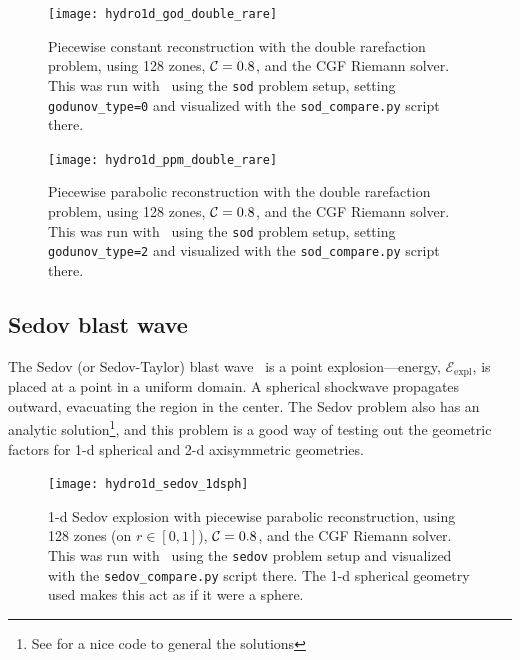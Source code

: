 \begin{figure}[t]
\centering
\texttt{[image: hydro1d\_god\_double\_rare]}
\caption[Piecewise constant reconstruction double rarefaction problem]{\label{fig:Euler:doublerare:god} Piecewise constant
  reconstruction with the double rarefaction problem, using 128 zones,
  ${\mathcal{C}} = 0.8$, and the CGF Riemann solver.  This was run with
  \hydrooned\ using the {\tt sod} problem setup, setting {\tt
    godunov\_type=0} and visualized with the {\tt sod\_compare.py}
  script there.}
\end{figure}

\begin{figure}[t]
\centering
\texttt{[image: hydro1d\_ppm\_double\_rare]}
\caption[Piecewise constant reconstruction double rarefaction problem]{\label{fig:Euler:doublerare:ppm} Piecewise parabolic
  reconstruction with the double rarefaction problem, using 128 zones,
  ${\mathcal{C}} = 0.8$, and the CGF Riemann solver.  This was run with
  \hydrooned\ using the {\tt sod} problem setup, setting {\tt
    godunov\_type=2} and visualized with the {\tt sod\_compare.py}
  script there.}
\end{figure}


\subsection{Sedov blast wave}

The Sedov (or Sedov-Taylor) blast wave~\cite{sedov:1959} is a point
explosion---energy, $\mathcal{E}_\mathrm{expl}$, is placed at a point
in a uniform domain.  A spherical shockwave propagates outward,
evacuating the region in the center.  The Sedov problem also has an
analytic solution\footnote{See \cite{timmes_sedov_code} for a nice
  code to general the solutions}, and this problem is a good way of
testing out the geometric factors for 1-d spherical and 2-d
axisymmetric geometries.

\begin{figure}[t]
\centering
\texttt{[image: hydro1d\_sedov\_1dsph]}
\caption[1-d spherical Sedov problem]{\label{fig:Euler:sedov1d} 1-d Sedov explosion with
  piecewise parabolic reconstruction, using 128 zones (on $r \in
  [0,1]$), ${\mathcal{C}} = 0.8$, and the CGF Riemann solver.  This was run
  with \hydrooned\ using the {\tt sedov} problem setup and visualized
  with the {\tt sedov\_compare.py} script there.  The 1-d spherical
  geometry used makes this act as if it were a sphere.}
\end{figure}

